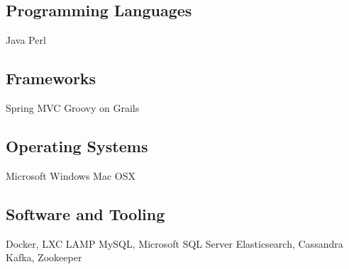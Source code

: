 \documentclass[11pt,letterpaper,roman]{moderncv} %
\begin{document}
\subsection{Programming Languages}

								{Java}
										{Perl}

\subsection{Frameworks}

						{Spring MVC}
							{Groovy on Grails}

\subsection{Operating Systems}

						{Microsoft Windows}
								{Mac OSX}

\subsection{Software and Tooling}

						{Docker, LXC}
										{LAMP}
					{MySQL, Microsoft SQL Server}
								{Elasticsearch, Cassandra}
								{Kafka, Zookeeper}
\end{document}
